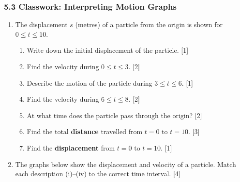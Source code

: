 \documentclass[12pt, twoside]{article}
\begin{document}
\subsubsection*{5.3 Classwork: Interpreting Motion Graphs}

\begin{enumerate}[itemsep=0.4cm]

\item The displacement $s$ (metres) of a particle from the origin is shown
      for $0 \leq t \leq 10$.

\begin{center}
\vspace{-0.3cm}
\vspace{-0.3cm}
\end{center}

\begin{enumerate}[itemsep=0.1cm]
  \item Write down the initial displacement of the particle. \hfill [1]
  \item Find the velocity during $0 \leq t \leq 3$. \hfill [2]
  \item Describe the motion of the particle during $3 \leq t \leq 6$. \hfill [1]
  \item Find the velocity during $6 \leq t \leq 8$. \hfill [2]
  \item At what time does the particle pass through the origin? \hfill [2]
  \item Find the total \textbf{distance} travelled from $t = 0$ to $t = 10$. \hfill [3]
  \item Find the \textbf{displacement} from $t = 0$ to $t = 10$. \hfill [1]
\end{enumerate}


\item The graphs below show the displacement and velocity of a particle.
      Match each description (i)--(iv) to the correct time interval. \hfill [4]


\end{enumerate}
\end{document}

